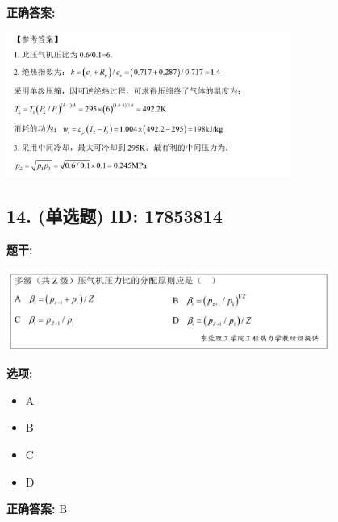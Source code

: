 \documentclass[12pt]{article}
\begin{document}
\textbf{正确答案:}

\begin{center}\includegraphics[width=0.7\textwidth, height=0.2\textheight, keepaspectratio]{question_13_17853827/correct_answer_1_img_1.png}\end{center}

\vspace{0.5em}\hrulefill\vspace{1em}

\subsection*{14. (单选题) \small ID: 17853814}

\textbf{题干:}


\begin{center}\includegraphics[width=0.8\textwidth, height=0.25\textheight, keepaspectratio]{question_14_17853814/title_img_1.png}\end{center}

\textbf{选项:}
\begin{itemize}[leftmargin=*]
  \item A

  \item B

  \item C

  \item D

\end{itemize}

\textbf{正确答案:}
B

\vspace{0.5em}\hrulefill\vspace{1em}
\end{document}
